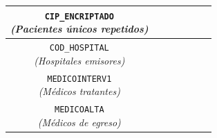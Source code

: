 \begin{table}[htbp]
\begin{tabular}{|c|c|c|c|c|c|c|}
\parbox[t]{2.5cm}{\raggedright\texttt{CIP\_ENCRIPTADO}\\\textit{(Pacientes únicos repetidos)}} & \parbox[t]{1.8cm}{} & \parbox[t]{1.8cm}{} & \parbox[t]{1.8cm}{} & \parbox[t]{1.8cm}{} & \parbox[t]{1.8cm}{} & \parbox[t]{1.8cm}{} \\ \hline
\parbox[t]{2.5cm}{\raggedright\texttt{COD\_HOSPITAL}\\\textit{(Hospitales emisores)}} & \parbox[t]{1.8cm}{} & \parbox[t]{1.8cm}{} & \parbox[t]{1.8cm}{} & \parbox[t]{1.8cm}{} & \parbox[t]{1.8cm}{} & \parbox[t]{1.8cm}{} \\ \hline
\parbox[t]{2.5cm}{\raggedright\texttt{MEDICOINTERV1}\\\textit{(Médicos tratantes)}} & \parbox[t]{1.8cm}{} & \parbox[t]{1.8cm}{} & \parbox[t]{1.8cm}{} & \parbox[t]{1.8cm}{} & \parbox[t]{1.8cm}{} & \parbox[t]{1.8cm}{} \\ \hline
\parbox[t]{2.5cm}{\raggedright\texttt{MEDICOALTA}\\\textit{(Médicos de egreso)}} & \parbox[t]{1.8cm}{} & \parbox[t]{1.8cm}{} & \parbox[t]{1.8cm}{} & \parbox[t]{1.8cm}{} & \parbox[t]{1.8cm}{} & \parbox[t]{1.8cm}{} \\ \hline
\end{tabular}
\end{table}

